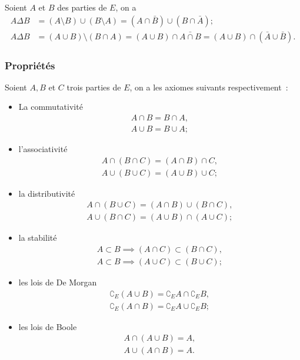 \begin{prop}
    Soient \(A\) et \(B\) des parties de \(E\), on a 
    \begin{align}
        A \Delta B &= (A\setminus B) \cup (B \setminus A) = (A \cap \bar{B}) \cup (B \cap 
        \bar{A}); \\
        A \Delta B &= (A \cup B) \setminus (B \cap A) = (A \cup B) \cap \bar{A \cap B} =(A 
        \cup B) \cap (\bar{A} \cup \bar{B}).
    \end{align}
\end{prop}

\subsubsection{Propriétés}
\label{chap3-subsubsec:prop}

\begin{axiome}
    Soient \(A, B\) et \(C\) trois parties de \(E\), on a les axiomes suivants 
    respectivement~:
    \begin{itemize}
        \item La commutativité
            \begin{gather}
                A \cap B= B \cap A, \\
                A \cup B=B \cup A;
            \end{gather}
        \item l'associativité
            \begin{gather}
                A \cap (B \cap C)=(A \cap B) \cap C, \\ 
                A \cup (B \cup C)=(A \cup B) \cup C;
            \end{gather}
        \item la distributivité
            \begin{gather}
                A \cap (B \cup C)=(A \cap B) \cup (B \cap C), \\ 
                A \cup (B \cap C)=(A \cup B) \cap (A \cup C);
            \end{gather}
        \item la stabilité
            \begin{gather}
                A \subset B \implies (A \cap C) \subset (B \cap C), \\ 
                A \subset B \implies (A \cup C) \subset (B \cup C);
            \end{gather}
        \item les lois de De Morgan
            \begin{gather}
                \complement_E (A \cup B)=\complement_E A \cap \complement_E B, \\ 
                \complement_E (A \cap B)=\complement_E A \cup \complement_E B;
            \end{gather}
        \item les lois de Boole
            \begin{gather}
                A \cap (A \cup B)=A, \\ 
                A \cup (A \cap B)=A.
            \end{gather}
    \end{itemize}
\end{axiome}

